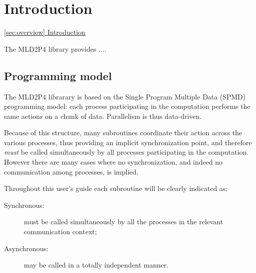\section{Introduction}\label{sec:intro}
         {\underline{\ref{sec:overview} Introduction}}

The MLD2P4 library provides ....


\subsection{Programming model}

The MLD2P4 librarary is based on the Single Program Multiple Data
(SPMD) programming model: each process participating in the
computation performs the same actions on a chunk of data. Parallelism
is thus data-driven. 

Because of this structure, many subroutines coordinate their action
across the various processes, thus providing an implicit
synchronization point, and therefore \emph{must} be
called simultaneously by all processes participating in the
computation. 
However there are many cases where no synchronization, and indeed no
communication among processes, is implied. 

Throughout this user's guide each subroutine will be clearly indicated
as:
\begin{description}
\item[Synchronous:] must be called simultaneously by all the
  processes in the relevant communication context;
\item[Asynchronous:] may be called in a totally independent manner.
\end{description}

